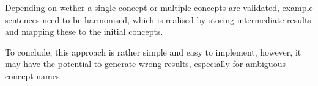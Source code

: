 Depending on wether a single concept or multiple concepts are validated, example sentences need to be harmonised, which is realised by storing intermediate results and mapping these to the initial concepts. 


To conclude, this approach is rather simple and easy to implement, however, it may have the potential to generate wrong results, especially for ambiguous concept names. 
